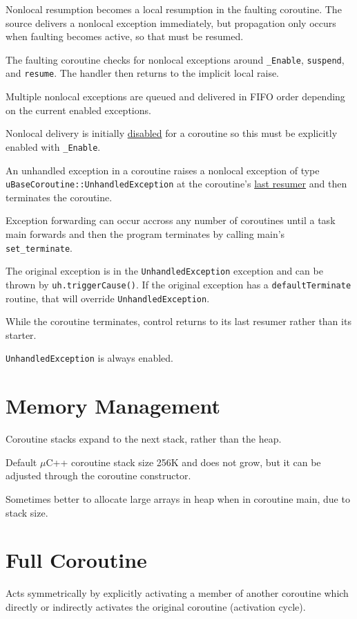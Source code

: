\documentclass[11pt]{article}
\begin{document}
Nonlocal resumption becomes a local resumption in the faulting coroutine.
The source delivers a nonlocal exception immediately, but propagation only occurs when faulting becomes
active, so that must be resumed.

The faulting coroutine checks for nonlocal exceptions around \texttt{\_Enable}, \texttt{suspend}, and \texttt{resume}.
The handler then returns to the implicit local raise.

Multiple nonlocal exceptions are queued and delivered in FIFO order depending on the
current enabled exceptions.

Nonlocal delivery is initially \uline{disabled} for a coroutine so this must be explicitly enabled
with \texttt{\_Enable}.

An unhandled exception in a coroutine raises a nonlocal exception of type
\texttt{uBaseCoroutine::UnhandledException} at the coroutine's \uline{last resumer} and then terminates the coroutine.

Exception forwarding can occur accross any number of coroutines until a task main forwards and then
the program terminates by calling main's \texttt{set\_terminate}.

The original exception is in the \texttt{UnhandledException} exception and can be thrown by \texttt{uh.triggerCause()}.
If the original exception has a \texttt{defaultTerminate} routine, that will override \texttt{UnhandledException}.

While the coroutine terminates, control returns to its last resumer rather than its starter.

\texttt{UnhandledException} is always enabled.
\section{Memory Management}
\label{sec:org99c30f6}
Coroutine stacks expand to the next stack, rather than the heap.

Default \(\mu\)C++ coroutine stack size 256K and does not grow, but it can be adjusted through
the coroutine constructor.

Sometimes better to allocate large arrays in heap when in coroutine main, due to stack size.
\section{Full Coroutine}
\label{sec:org943d024}
Acts symmetrically by explicitly activating a member of another coroutine which directly or indirectly
activates the original coroutine (activation cycle).
\end{document}
